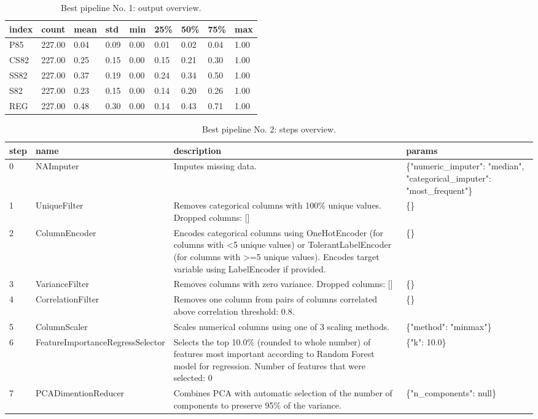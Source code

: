 \documentclass{article}%
\begin{document}
%


\begin{table}[H]%
\begin{center}%
\renewcommand{\arraystretch}{1.5}%
\begin{tabular}{l l l l l l l l l}%
\hline%
\textbf{index}&\textbf{count}&\textbf{mean}&\textbf{std}&\textbf{min}&\textbf{25\%}&\textbf{50\%}&\textbf{75\%}&\textbf{max}\\%
\hline%
P85&227.00&0.04&0.09&0.00&0.01&0.02&0.04&1.00\\%
CS82&227.00&0.25&0.15&0.00&0.15&0.21&0.30&1.00\\%
SS82&227.00&0.37&0.19&0.00&0.24&0.34&0.50&1.00\\%
S82&227.00&0.23&0.15&0.00&0.14&0.20&0.26&1.00\\%
REG&227.00&0.48&0.30&0.00&0.14&0.43&0.71&1.00\\%
\hline%
\end{tabular}%
\end{center}%
\caption{Best pipeline No. 1: output overview.}%
\end{table}

%


\begin{table}[H]%
\begin{center}%
\renewcommand{\arraystretch}{1.5}%
\begin{tabular}{p{7mm} p{50mm} p{80mm} p{40mm}}%
\hline%
\textbf{step}&\textbf{name}&\textbf{description}&\textbf{params}\\%
\hline%
0&NAImputer&Imputes missing data.&\{"numeric\_imputer": "median", "categorical\_imputer": "most\_frequent"\}\\%
1&UniqueFilter&Removes categorical columns with 100\% unique values. Dropped columns: {[}{]}&\{\}\\%
2&ColumnEncoder&Encodes categorical columns using OneHotEncoder (for columns with <5 unique values) or TolerantLabelEncoder (for columns with >=5 unique values). Encodes target variable using LabelEncoder if provided.&\{\}\\%
3&VarianceFilter&Removes columns with zero variance. Dropped columns: {[}{]}&\{\}\\%
4&CorrelationFilter&Removes one column from pairs of columns correlated above correlation threshold: 0.8.&\{\}\\%
5&ColumnScaler&Scales numerical columns using one of 3 scaling methods.&\{"method": "minmax"\}\\%
6&FeatureImportanceRegressSelector&Selects the top 10.0\% (rounded to whole number) of features most important according to Random Forest model for regression. Number of features that were selected: 0&\{"k": 10.0\}\\%
7&PCADimentionReducer&Combines PCA with automatic selection of the number of components to preserve 95\% of the variance.&\{"n\_components": null\}\\%
\hline%
\end{tabular}%
\end{center}%
\caption{Best pipeline No. 2: steps overview.}%
\end{table}
\end{document}
